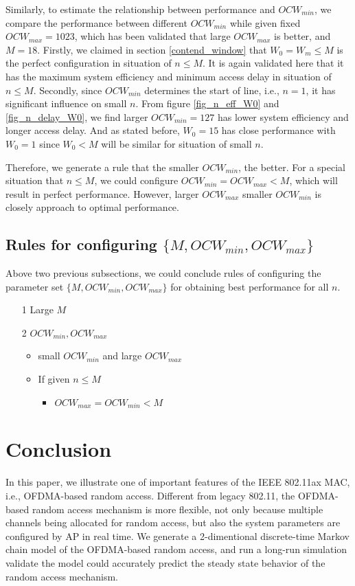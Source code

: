 \documentclass[journal]{IEEEtran}
\begin{document}
Similarly, to estimate the relationship between performance and $OCW_{min}$, we compare the performance between different $OCW_{min}$ while given fixed $OCW_{max}=1023$, which has been validated that large $OCW_{max}$ is better, and $M=18$. 
Firstly, we claimed in section \ref{contend_window} that $W_0=W_m\leq M$ is the perfect configuration in situation of $n\leq M$. It is again validated here that it has the maximum system efficiency and minimum access delay in situation of $n\leq M$. 
Secondly, since $OCW_{min}$ determines the start of line, i.e., $n=1$, it has significant influence on small $n$.
From figure \ref{fig_n_eff_W0} and \ref{fig_n_delay_W0}, we find larger $OCW_{min}=127$ has lower system efficiency and longer access delay. And as stated before, $W_0=15$ has close performance with $W_0=1$ since $W_0<M$ will be similar for situation of small $n$.

Therefore, we generate a rule that the smaller $OCW_{min}$, the better.
For a special situation that $n\leq M$, we could configure $OCW_{min}=OCW_{max}<M$, which will result in perfect performance. 
However, larger $OCW_{max}$ smaller $OCW_{min}$ is closely approach to optimal performance.

\subsection{Rules for configuring $\lbrace M, OCW_{min}, OCW_{max} \rbrace$}
Above two previous subsections, we could conclude rules of configuring the parameter set $\lbrace M, OCW_{min}, OCW_{max} \rbrace$ for obtaining best performance for all $n$. 
\begin{itemize}
\item[1] Large $M$
\item[2] $OCW_{min}, OCW_{max}$
	\begin{itemize}
	\item small $OCW_{min}$ and large $OCW_{max}$
	\item If given $n\leq M$
	\begin{itemize}
		\item $OCW_{max}=OCW_{min}<M$
	\end{itemize}
	\end{itemize}
\end{itemize}






\section{Conclusion}   \label{sec_conclu}
In this paper, we illustrate one of important features of the IEEE 802.11ax MAC, i.e., OFDMA-based random access. 
Different from legacy 802.11, the OFDMA-based random access mechanism is more flexible, not only because multiple channels being allocated for random access, but also the system parameters are configured by AP in real time.
We generate a 2-dimentional discrete-time Markov chain model of the OFDMA-based random access, and run a long-run simulation validate the model could accurately predict the steady state behavior of the random access mechanism.
\end{document}
